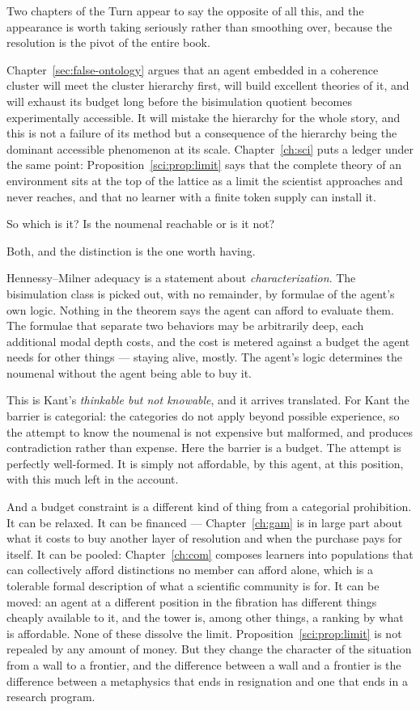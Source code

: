 Two chapters of the Turn appear to say the opposite of all this,
and the appearance is worth taking seriously rather than
smoothing over, because the resolution is the pivot of the entire
book.

Chapter~\ref{sec:false-ontology} argues that an agent embedded in a
coherence cluster will meet the cluster hierarchy first, will build
excellent theories of it, and will exhaust its budget long before
the bisimulation quotient becomes experimentally accessible.
It will mistake the hierarchy for the whole story, and this is not
a failure of its method but a consequence of the hierarchy being
the dominant accessible phenomenon at its scale.
Chapter~\ref{ch:sci} puts a ledger under the same point:
Proposition~\ref{sci:prop:limit} says that the complete theory of an
environment sits at the top of the lattice as a limit the scientist
approaches and never reaches, and that no learner with a finite
token supply can install it.

So which is it?
Is the noumenal reachable or is it not?

Both, and the distinction is the one worth having.

Hennessy--Milner adequacy is a statement about \emph{characterization}.
The bisimulation class is picked out, with no remainder, by
formulae of the agent's own logic.
Nothing in the theorem says the agent can afford to evaluate them.
The formulae that separate two behaviors may be arbitrarily deep,
each additional modal depth costs, and the cost is metered against
a budget the agent needs for other things --- staying alive, mostly.
The agent's logic determines the noumenal without the agent being
able to buy it.

This is Kant's \emph{thinkable but not knowable}, and it arrives
translated.
For Kant the barrier is categorial: the categories do not apply
beyond possible experience, so the attempt to know the noumenal is
not expensive but malformed, and produces contradiction rather than
expense.
Here the barrier is a budget.
The attempt is perfectly well-formed.
It is simply not affordable, by this agent, at this position, with
this much left in the account.

And a budget constraint is a different kind of thing from a
categorial prohibition.
It can be relaxed.
It can be financed --- Chapter~\ref{ch:gam} is in large part about
what it costs to buy another layer of resolution and when the
purchase pays for itself.
It can be pooled: Chapter~\ref{ch:com} composes learners into
populations that can collectively afford distinctions no member can
afford alone, which is a tolerable formal description of what a
scientific community is for.
It can be moved: an agent at a different position in the fibration
has different things cheaply available to it, and the tower is,
among other things, a ranking by what is affordable.
None of these dissolve the limit.
Proposition~\ref{sci:prop:limit} is not repealed by any amount of
money.
But they change the character of the situation from a wall to a
frontier, and the difference between a wall and a frontier is the
difference between a metaphysics that ends in resignation and one
that ends in a research program.

